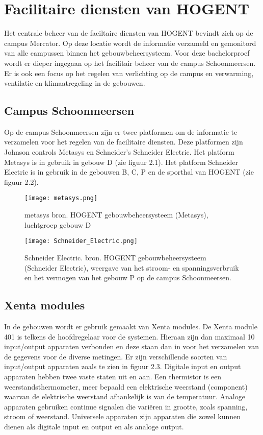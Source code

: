 \section{Facilitaire diensten van HOGENT}
Het centrale beheer van de faciltaire diensten van HOGENT bevindt zich op de campus Mercator. Op deze locatie  wordt de informatie verzameld en gemonitord van alle campussen binnen het gebouwbeheersysteem. Voor deze bachelorproef wordt er dieper ingegaan op het facilitair beheer van de campus Schoonmeersen. Er is ook een focus op het regelen van verlichting op de campus en verwarming, ventilatie en klimaatregeling in de gebouwen.

\subsection{Campus Schoonmeersen}
Op de campus Schoonmeersen zijn er twee platformen om de informatie te verzamelen voor het regelen van de facilitaire diensten. Deze platformen zijn Johnson controls Metasys en Schneider’s Schneider Electric. Het platform Metasys is in gebruik in gebouw D  (zie figuur 2.1). Het platform Schneider Electric is in gebruik in de gebouwen B, C, P en de sporthal van HOGENT (zie figuur 2.2)\autocite{Venneman2019}.

\begin{figure}
    \centering
    \texttt{[image: metasys.png]}
    \caption[metasys bron. HOGENT gebouwbeheersysteem (Metasys)]{\label{fig:metasys}metasys bron. HOGENT gebouwbeheersysteem (Metasys), luchtgroep gebouw D}
\end{figure}
\begin{figure}
    \centering
    \texttt{[image: Schneider\_Electric.png]}
    \caption[Schneider Electric. bron. HOGENT gebouwbeheersysteem (Schneider Electric)]{\label{fig:schneiderelectric}Schneider Electric. bron. HOGENT gebouwbeheersysteem (Schneider Electric), weergave van het stroom- en spanningsverbruik en het vermogen van het gebouw P op de campus Schoonmeersen.}
\end{figure}

\subsection{Xenta modules}
In de gebouwen wordt er gebruik gemaakt van Xenta modules. De Xenta module 401 is telkens de hoofdregelaar voor de systemen. Hieraan zijn dan maximaal 10 input/output apparaten verbonden en deze staan dan in voor het verzamelen van de gegevens voor de diverse metingen. Er zijn verschillende soorten van input/output apparaten zoals te zien in figuur 2.3. Digitale input en output apparaten hebben twee vaste staten uit en aan. Een thermistor is een weerstandsthermometer, meer bepaald een elektrische weerstand (component) waarvan de elektrische weerstand afhankelijk is van de temperatuur. \newline \newline
Analoge apparaten gebruiken continue signalen die variëren in grootte, zoals spanning, stroom of weerstand. Universele apparaten zijn apparaten die zowel kunnen dienen als digitale input en output en als analoge output.


